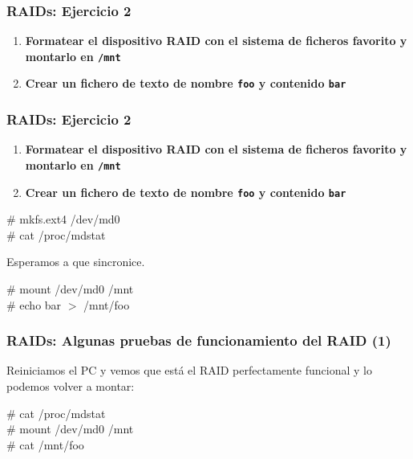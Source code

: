 \documentclass{beamer}
\begin{document}
\begin{frame}
  \frametitle{RAIDs: Ejercicio 2}

\begin{enumerate}
\item \textbf{Formatear el dispositivo RAID con el sistema de ficheros favorito y montarlo en \texttt{/mnt}}
\item \textbf{Crear un fichero de texto de nombre \texttt{foo} y contenido \texttt{bar}}
\end{enumerate}

\end{frame}


\begin{frame}
  \frametitle{RAIDs: Ejercicio 2}

\begin{enumerate}
\item \textbf{Formatear el dispositivo RAID con el sistema de ficheros favorito y montarlo en \texttt{/mnt}}
\item \textbf{Crear un fichero de texto de nombre \texttt{foo} y contenido \texttt{bar}}
\end{enumerate}

\pause

  \begin{block}{}
\# mkfs.ext4 /dev/md0 \\
\# cat /proc/mdstat
  \end{block}
  Esperamos a que sincronice.

  \begin{block}{}
\# mount /dev/md0 /mnt \\

\# echo bar $>$ /mnt/foo
  \end{block}

\end{frame}



\begin{frame}
  \frametitle{RAIDs: Algunas pruebas de funcionamiento del RAID (1)}

Reiniciamos el PC y vemos que está el RAID perfectamente funcional y lo podemos volver a montar:

\pause

  \begin{block}{}
\# cat /proc/mdstat \\
\# mount /dev/md0 /mnt \\
\# cat /mnt/foo
  \end{block}

\end{frame}
\end{document}
